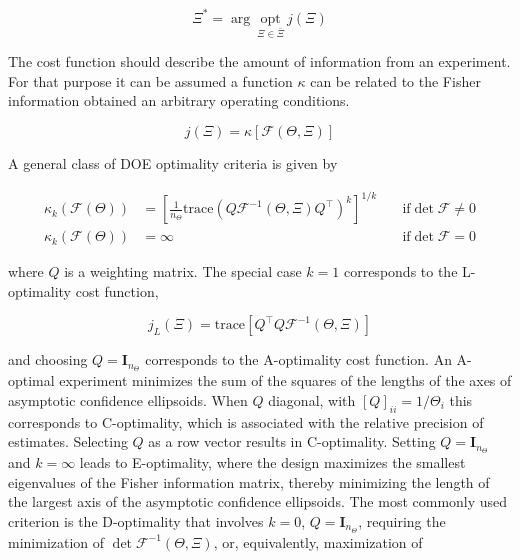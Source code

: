 \documentclass[../Article_Design_of_Experiment.tex]{subfiles}
\begin{document}
	{\footnotesize
	\begin{equation}
		\Xi^* = \arg~\underset{\Xi \in \bar{\Xi}}{\text{opt}}~j\left(\Xi\right)
	\end{equation} }
	
	The cost function should describe the amount of information from an experiment. For that purpose it can be assumed a function $\kappa$ can be related to the Fisher information obtained an arbitrary operating conditions.
	
	{\footnotesize
	\begin{equation}
		j(\Xi) = \kappa\left[ \mathcal{F}(\Theta, \Xi) \right]
	\end{equation} }
	
	
	A general class of DOE optimality criteria is given by
	
	{\footnotesize
	\begin{align}
		\kappa_k(\mathcal{F}(\Theta)) &= \left[\frac{1}{n_\Theta} \text{trace}\left( Q\mathcal{F}^{-1}(\Theta, \Xi) Q^\top \right)^k \right]^{1/k} \quad &\text{if} \det \mathcal{F} \neq 0 \nonumber \\
		\kappa_k(\mathcal{F}(\Theta)) &= \infty \quad &\text{if} \det \mathcal{F} = 0
	\end{align} }
	
	where $Q$ is a weighting matrix. The special case $k = 1$ corresponds to the L-optimality cost function,
	
	{\footnotesize
	\begin{equation}
		j_L(\Xi) = \text{trace} \left[ Q^\top Q\mathcal{F}^{-1}(\Theta,\Xi) \right]
	\end{equation} }
	
	and choosing $Q = \textbf{I}_{n_\Theta}$ corresponds to the A-optimality cost function. An A-optimal experiment minimizes the sum of the squares of the lengths of the axes of asymptotic confidence ellipsoids. When $Q$ diagonal, with $[Q]_{ii} = 1/\Theta_i$ this corresponds to C-optimality, which is associated with the relative precision of estimates. Selecting $Q$ as a row vector results in C-optimality. Setting $Q = \textbf{I}_{n_\Theta}$ and $k = \infty$ leads to E-optimality, where the design maximizes the smallest eigenvalues of the Fisher information matrix, thereby minimizing the length of the largest axis of the asymptotic confidence ellipsoids. The most commonly used criterion is the D-optimality that involves $k = 0$, $Q = \textbf{I}_{n_\Theta}$, requiring the minimization of $\det \mathcal{F}^{-1}(\Theta, \Xi)$, or, equivalently, maximization of
	
\end{document}
